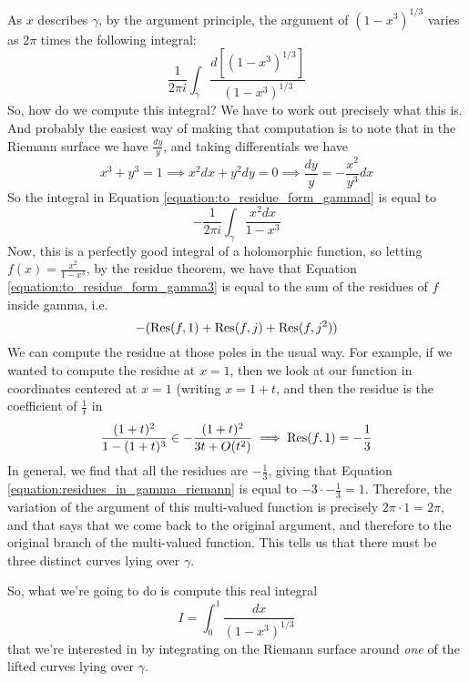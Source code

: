 \documentclass{article}
\begin{document}
As \(x\) describes \(\gamma\), by the argument principle, the argument of \((1 - x^3)^{1/3}\) varies as \(2\pi\) times the following integral:
\begin{equation}
  \frac{1}{2\pi i}\int_\gamma\frac{d[(1 - x^3)^{1/3}]}{(1 - x^3)^{1/3}}
  \label{equation:to_residue_form_gammad}
\end{equation}
So, how do we compute this integral? We have to work out precisely what this is. And probably the easiest way of making that computation is to note that in the Riemann surface we have \(\frac{dy}{y}\), and taking differentials we have
\begin{equation}
  x^3 + y^3 = 1 \implies x^2dx + y^2dy = 0 \implies \frac{dy}{y} = -\frac{x^2}{y^3}dx
  \label{equation:differential_dx_dy}
\end{equation}
So the integral in Equation \ref{equation:to_residue_form_gammad} is equal to
\begin{equation}
  -\frac{1}{2\pi i}\int_\gamma\frac{x^2dx}{1 - x^3}
  \label{equation:to_residue_form_gamma3}
\end{equation}
Now, this is a perfectly good integral of a holomorphic function, so letting \(f(x) = \frac{x^2}{1 - x^3}\), by the residue theorem, we have that Equation \ref{equation:to_residue_form_gamma3} is equal to the sum of the residues of \(f\) inside gamma, i.e.
\begin{equation}
  -(\operatorname{Res}(f, 1) + \operatorname{Res}(f, j) + \operatorname{Res}(f, j^2))
  \label{equation:residues_in_gamma_riemann}
\end{equation}
We can compute the residue at those poles in the usual way. For example, if we wanted to compute the residue at \(x = 1\), then we look at our function in coordinates centered at \(x = 1\) (writing \(x = 1 + t\), and then the residue is the coefficient of \(\frac{1}{t}\) in
\begin{equation}
  \frac{(1 + t)^2}{1 - (1 + t)^3} \in -\frac{(1 + t)^2}{3t + O(t^2)} \implies \operatorname{Res}(f, 1) = -\frac{1}{3}
\end{equation}
In general, we find that all the residues are \(-\frac{1}{3}\), giving that Equation \ref{equation:residues_in_gamma_riemann} is equal to \(-3 \cdot -\frac{1}{3} = 1\). Therefore, the variation of the argument of this multi-valued function is precisely \(2\pi \cdot 1 = 2\pi\), and that says that we come back to the original argument, and therefore to the original branch of the multi-valued function. This tells us that there must be three distinct curves lying over \(\gamma\).

So, what we're going to do is compute this real integral
\begin{equation}
  I = \int_0^1\frac{dx}{(1 - x^3)^{1/3}}
\end{equation}
that we're interested in by integrating on the Riemann surface around \textit{one} of the lifted curves lying over \(\gamma\).
\end{document}
